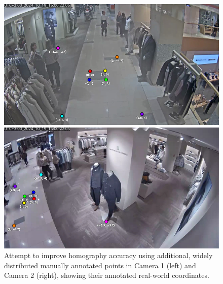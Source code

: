 \documentclass[12pt, a4paper]{article}
\begin{document}
\begin{figure}[H]
    \centering
    \begin{minipage}{0.48\linewidth}
        \centering
        \includegraphics[width=\linewidth]{pictures/keypoints1_ext.png} %
    \end{minipage}
    \hfill %
    \begin{minipage}{0.48\linewidth}
        \centering
        \includegraphics[width=\linewidth]{pictures/keypoints2_ext.png} %
    \end{minipage}
    \caption{Attempt to improve homography accuracy using additional, widely distributed manually annotated points in Camera 1 (left) and Camera 2 (right), showing their annotated real-world coordinates.}
    \label{fig:wide_homography_points_pair}
\end{figure}
\end{document}
